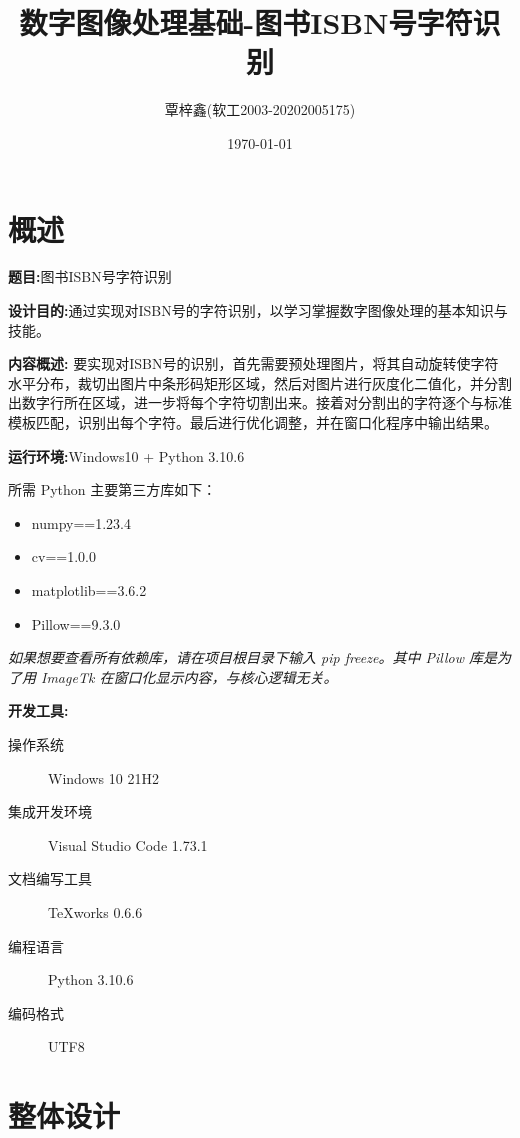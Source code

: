 \documentclass{ctexart}
\begin{document}
\title{数字图像处理基础-图书ISBN号字符识别}
\author{覃梓鑫(软工2003-20202005175)}
\date{\today}
\maketitle
\tableofcontents
\newpage
\section{概述}

\textbf{题目:}图书ISBN号字符识别

\textbf{设计目的:}通过实现对ISBN号的字符识别，以学习掌握数字图像处理的基本知识与技能。

\textbf{内容概述:}
要实现对ISBN号的识别，首先需要预处理图片，将其自动旋转使字符水平分布，裁切出图片中条形码矩形区域，然后对图片进行灰度化二值化，并分割出数字行所在区域，进一步将每个字符切割出来。接着对分割出的字符逐个与标准模板匹配，识别出每个字符。最后进行优化调整，并在窗口化程序中输出结果。

\textbf{运行环境:}Windows10 + Python 3.10.6

所需 Python 主要第三方库如下：
\begin{itemize}
    \item numpy==1.23.4
    \item cv==1.0.0
    \item matplotlib==3.6.2
    \item Pillow==9.3.0
\end{itemize}

\textit{如果想要查看所有依赖库，请在项目根目录下输入 pip freeze。其中 Pillow 库是为了用 ImageTk 在窗口化显示内容，与核心逻辑无关。}

\textbf{开发工具:}%
\begin{description}
    \item[操作系统] Windows 10 21H2
    \item[集成开发环境] Visual Studio Code 1.73.1
    \item[文档编写工具] TeXworks 0.6.6
    \item[编程语言] Python 3.10.6
    \item[编码格式] UTF8
\end{description}

\section{整体设计}
\end{document}
